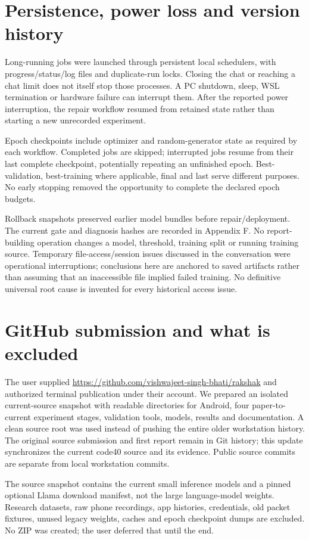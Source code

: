 \documentclass[11pt,a4paper,oneside]{report}
\begin{document}
\section{Persistence, power loss and version history}
Long-running jobs were launched through persistent local schedulers, with progress/status/log files and duplicate-run locks. Closing the chat or reaching a chat limit does not itself stop those processes. A PC shutdown, sleep, WSL termination or hardware failure can interrupt them. After the reported power interruption, the repair workflow resumed from retained state rather than starting a new unrecorded experiment.

Epoch checkpoints include optimizer and random-generator state as required by each workflow. Completed jobs are skipped; interrupted jobs resume from their last complete checkpoint, potentially repeating an unfinished epoch. Best-validation, best-training where applicable, final and last serve different purposes. No early stopping removed the opportunity to complete the declared epoch budgets.

Rollback snapshots preserved earlier model bundles before repair/deployment. The current gate and diagnosis hashes are recorded in Appendix F. No report-building operation changes a model, threshold, training split or running training source. Temporary file-access/session issues discussed in the conversation were operational interruptions; conclusions here are anchored to saved artifacts rather than assuming that an inaccessible file implied failed training. No definitive universal root cause is invented for every historical access issue.

\section{GitHub submission and what is excluded}
The user supplied \url{https://github.com/vishwajeet-singh-bhati/rakshak} and authorized terminal publication under their account. We prepared an isolated current-source snapshot with readable directories for Android, four paper-to-current experiment stages, validation tools, models, results and documentation. A clean source root was used instead of pushing the entire older workstation history. The original source submission and first report remain in Git history; this update synchronizes the current code40 source and its evidence. Public source commits are separate from local workstation commits.

The source snapshot contains the current small inference models and a pinned optional Llama download manifest, not the large language-model weights. Research datasets, raw phone recordings, app histories, credentials, old packet fixtures, unused legacy weights, caches and epoch checkpoint dumps are excluded. No ZIP was created; the user deferred that until the end.
\end{document}
